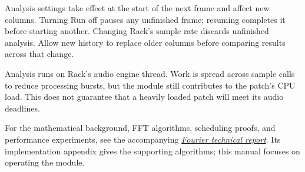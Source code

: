 \documentclass[12pt,letterpaper]{article}
\begin{document}
Analysis settings take effect at the start of the next frame and affect new
columns. Turning Run off pauses any unfinished frame; resuming completes it
before starting another. Changing Rack's sample rate discards unfinished
analysis. Allow new history to replace older columns before comparing results
across that change.

Analysis runs on Rack's audio engine thread. Work is spread across sample
calls to reduce processing bursts, but the module still contributes to the
patch's CPU load. This does not guarantee that a heavily loaded patch will
meet its audio deadlines.

For the mathematical background, FFT algorithms, scheduling proofs, and
performance experiments, see the accompanying
\href{https://github.com/Kautenja/ArhythmeticUnits-Fourier/tree/main/whitepaper}{\textit{Fourier technical report}}.
Its implementation appendix gives the supporting algorithms; this manual
focuses on operating the module.


\clearpage
\finalPage
\end{document}
